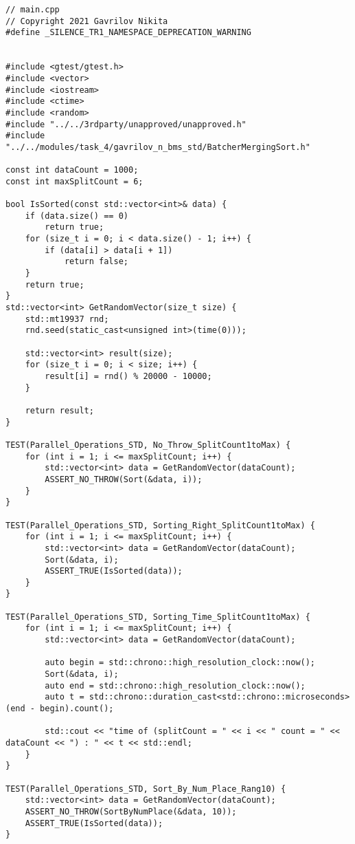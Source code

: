 \documentclass{report}
\begin{document}
\begin{lstlisting}
// main.cpp
// Copyright 2021 Gavrilov Nikita
#define _SILENCE_TR1_NAMESPACE_DEPRECATION_WARNING


#include <gtest/gtest.h>
#include <vector>
#include <iostream>
#include <ctime>
#include <random>
#include "../../3rdparty/unapproved/unapproved.h"
#include "../../modules/task_4/gavrilov_n_bms_std/BatcherMergingSort.h"

const int dataCount = 1000;
const int maxSplitCount = 6;

bool IsSorted(const std::vector<int>& data) {
    if (data.size() == 0)
        return true;
    for (size_t i = 0; i < data.size() - 1; i++) {
        if (data[i] > data[i + 1])
            return false;
    }
    return true;
}
std::vector<int> GetRandomVector(size_t size) {
    std::mt19937 rnd;
    rnd.seed(static_cast<unsigned int>(time(0)));

    std::vector<int> result(size);
    for (size_t i = 0; i < size; i++) {
        result[i] = rnd() % 20000 - 10000;
    }

    return result;
}

TEST(Parallel_Operations_STD, No_Throw_SplitCount1toMax) {
    for (int i = 1; i <= maxSplitCount; i++) {
        std::vector<int> data = GetRandomVector(dataCount);
        ASSERT_NO_THROW(Sort(&data, i));
    }
}

TEST(Parallel_Operations_STD, Sorting_Right_SplitCount1toMax) {
    for (int i = 1; i <= maxSplitCount; i++) {
        std::vector<int> data = GetRandomVector(dataCount);
        Sort(&data, i);
        ASSERT_TRUE(IsSorted(data));
    }
}

TEST(Parallel_Operations_STD, Sorting_Time_SplitCount1toMax) {
    for (int i = 1; i <= maxSplitCount; i++) {
        std::vector<int> data = GetRandomVector(dataCount);

        auto begin = std::chrono::high_resolution_clock::now();
        Sort(&data, i);
        auto end = std::chrono::high_resolution_clock::now();
        auto t = std::chrono::duration_cast<std::chrono::microseconds>(end - begin).count();

        std::cout << "time of (splitCount = " << i << " count = " << dataCount << ") : " << t << std::endl;
    }
}

TEST(Parallel_Operations_STD, Sort_By_Num_Place_Rang10) {
    std::vector<int> data = GetRandomVector(dataCount);
    ASSERT_NO_THROW(SortByNumPlace(&data, 10));
    ASSERT_TRUE(IsSorted(data));
}


\end{lstlisting}
\end{document}
